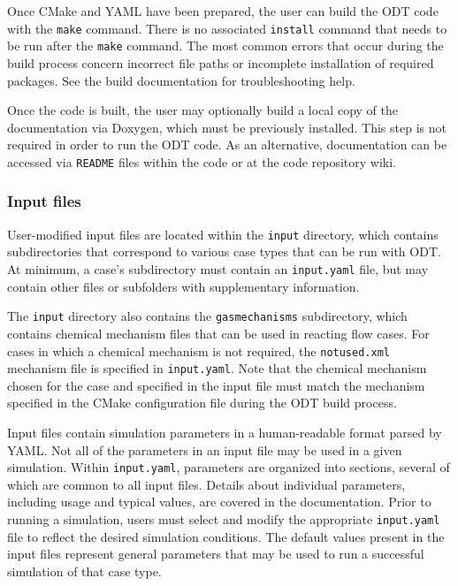 \documentclass[preprint,12pt, a4paper]{elsarticle}
\begin{document}
Once CMake and YAML have been prepared, the user can build the ODT code with the \texttt{make} command. There is no associated \texttt{install} command that needs to be run after the \texttt{make} command. The most common errors that occur during the build process concern incorrect file paths or incomplete installation of required packages. See the build documentation for troubleshooting help. 

Once the code is built, the user may optionally build a local copy of the documentation via Doxygen, which must be previously installed. This step is not required in order to run the ODT code. As an alternative, documentation can be accessed via \texttt{README} files within the code or at the code repository wiki. 

\subsubsection{Input files}

User-modified input files are located within the \texttt{input} directory, which contains subdirectories that correspond to various case types that can be run with ODT. At minimum, a case's subdirectory must contain an \texttt{input.yaml} file, but may contain other files or subfolders with supplementary information. 

The \texttt{input} directory also contains the \texttt{gas\textunderscore mechanisms} subdirectory, which contains chemical mechanism files that can be used in reacting flow cases. For cases in which a chemical mechanism is not required, the \texttt{not\textunderscore used.xml} mechanism file is specified in \texttt{input.yaml}. Note that the chemical mechanism chosen for the case and specified in the input file must match the mechanism specified in the CMake configuration file during the ODT build process. 

Input files contain simulation parameters in a human-readable format parsed by YAML. Not all of the parameters in an input file may be used in a given simulation. Within \texttt{input.yaml}, parameters are organized into sections, several of which are common to all input files. Details about individual parameters, including usage and typical values, are covered in the documentation. Prior to running a simulation, users must select and modify the appropriate \texttt{input.yaml} file to reflect the desired simulation conditions. The default values present in the input files represent general parameters that may be used to run a successful simulation of that case type. 
\end{document}
